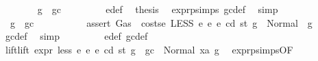 \begin{isabellebody}
\ \ \ \ \ \ \isamarkupfalse%
\ {\isachardoublequoteopen}g\ {\isasymle}\ gc{\isachardoublequoteclose}\isanewline
\ \ \ \ \ \ \isamarkupfalse%
\ {}{}{\isacharparenleft}{\kern0pt}{}{\isacharparenright}{\kern0pt}\ e{\isacharunderscore}{\kern0pt}def\ \isamarkupfalse%
\ {\isacharquery}{\kern0pt}thesis\ \isamarkupfalse%
\ expr{\isachardot}{\kern0pt}psimps{\isacharparenleft}{\kern0pt}{}{}{\isacharparenright}{\kern0pt}\ gc{\isacharunderscore}{\kern0pt}def\ \isamarkupfalse%
\ simp\isanewline
\ \ \ \ \isamarkupfalse%
\isanewline
\ \ \ \ \ \ \isamarkupfalse%
\ {\isachardoublequoteopen}{\isasymnot}\ g\ {\isasymle}\ gc{\isachardoublequoteclose}\isanewline
\ \ \ \ \ \ \isamarkupfalse%
\ \isamarkupfalse%
\ {\isacharasterisk}{\kern0pt}{\isacharcolon}{\kern0pt}\ {\isachardoublequoteopen}assert\ Gas\ {\isacharparenleft}{\kern0pt}{\isacharparenleft}{\kern0pt}{\isacharless}{\kern0pt}{\isacharparenright}{\kern0pt}\ {\isacharparenleft}{\kern0pt}costs\isactrlsub e\ {\isacharparenleft}{\kern0pt}LESS\ e{}\ e{}{\isacharparenright}{\kern0pt}\ e\ cd\ st{\isacharparenright}{\kern0pt}{\isacharparenright}{\kern0pt}\ g\ {\isacharequal}{\kern0pt}\ Normal\ {\isacharparenleft}{\kern0pt}{\isacharparenleft}{\kern0pt}{\isacharparenright}{\kern0pt}{\isacharcomma}{\kern0pt}\ g{\isacharparenright}{\kern0pt}{\isachardoublequoteclose}\ \isamarkupfalse%
\ gc{\isacharunderscore}{\kern0pt}def\ \isamarkupfalse%
\ simp\isanewline
\ \ \ \ \ \ \isamarkupfalse%
\ {}{}{\isacharparenleft}{\kern0pt}{}{\isacharparenright}{\kern0pt}\ e{\isacharunderscore}{\kern0pt}def\ gc{\isacharunderscore}{\kern0pt}def\ \isamarkupfalse%
\ lift{\isacharcolon}{\kern0pt}{\isachardoublequoteopen}lift\ expr\ less\ e{}\ e{}\ e\ cd\ st\ {\isacharparenleft}{\kern0pt}g\ {\isacharminus}{\kern0pt}\ gc{\isacharparenright}{\kern0pt}\ {\isacharequal}{\kern0pt}\ Normal\ {\isacharparenleft}{\kern0pt}xa{\isacharcomma}{\kern0pt}\ g{}{\isacharparenright}{\kern0pt}{\isachardoublequoteclose}\ \isamarkupfalse%
\ expr{\isachardot}{\kern0pt}psimps{\isacharparenleft}{\kern0pt}{}{}{\isacharparenright}{\kern0pt}{\isacharbrackleft}{\kern0pt}OF\ {}{}{\isacharparenleft}{\kern0pt}{}{\isacharparenright}{\kern0pt}{\isacharbrackright}{\kern0pt}\ \isamarkupfalse%

\end{isabellebody}
